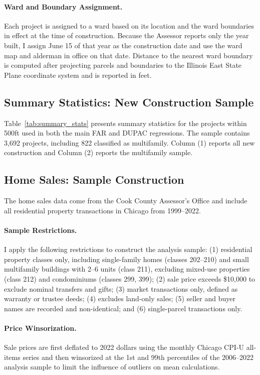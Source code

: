 \paragraph{Ward and Boundary Assignment.}
Each project is assigned to a ward based on its location and the ward boundaries in effect at the time of construction.
Because the Assessor reports only the year built, I assign June 15 of that year as the construction date and use the ward map and alderman in office on that date.
Distance to the nearest ward boundary is computed after projecting parcels and boundaries to the Illinois East State Plane coordinate system and is reported in feet.

\subsection{Summary Statistics: New Construction Sample}

Table~\ref{tab:summary_stats} presents summary statistics for the projects within 500ft used in both the main FAR and DUPAC regressions.
The sample contains 3,692 projects, including 822 classified as multifamily.
Column (1) reports all new construction and Column (2) reports the multifamily sample.

\subsection{Home Sales: Sample Construction}
\label{subsec:sales_sample}

The home sales data come from the Cook County Assessor's Office and include all residential property transactions in Chicago from 1999--2022.

\paragraph{Sample Restrictions.}
I apply the following restrictions to construct the analysis sample: (1) residential property classes only, including single-family homes (classes 202--210) and small multifamily buildings with 2--6 units (class 211), excluding mixed-use properties (class 212) and condominiums (classes 299, 399); (2) sale price exceeds \$10,000 to exclude nominal transfers and gifts; (3) market transactions only, defined as warranty or trustee deeds; (4) excludes land-only sales; (5) seller and buyer names are recorded and non-identical; and (6) single-parcel transactions only.

\paragraph{Price Winsorization.}
Sale prices are first deflated to 2022 dollars using the monthly Chicago CPI-U all-items series and then winsorized at the 1st and 99th percentiles of the 2006--2022 analysis sample to limit the influence of outliers on mean calculations.


